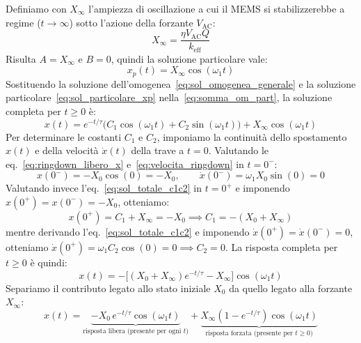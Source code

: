 \documentclass[11pt,a4paper]{article}
\begin{document}
Definiamo con $X_\infty$ l'ampiezza di oscillazione a cui il MEMS si stabilizzerebbe a regime ($t \to \infty$) sotto l'azione della forzante $V_{\text{AC}}$:
\begin{equation}
    \label{eq:def_X_inf}
    X_\infty = \frac{\eta V_{\text{AC}} Q}{k_{\text{eff}}}
\end{equation}
Risulta $A = X_\infty$ e $B = 0$, quindi la soluzione particolare vale:
\begin{equation}
    \label{eq:sol_particolare_xp}
    x_p(t) = X_\infty \cos(\omega_1 t)
\end{equation}
Sostituendo la soluzione dell'omogenea~\eqref{eq:sol_omogenea_generale} e la soluzione particolare~\eqref{eq:sol_particolare_xp} nella~\eqref{eq:somma_om_part}, la soluzione completa per $t \ge 0$ è:
\begin{equation}
    \label{eq:sol_totale_c1c2}
    x(t) = e^{-t/\tau}\Big( C_1 \cos(\omega_1 t) + C_2 \sin(\omega_1 t) \Big) + X_\infty \cos(\omega_1 t)
\end{equation}
Per determinare le costanti $C_1$ e $C_2$, imponiamo la continuità dello spostamento $x(t)$ e della velocità $\dot{x}(t)$ della trave a $t = 0$. Valutando le eq.~\eqref{eq:ringdown_libero_x} e~\eqref{eq:velocita_ringdown} in $t = 0^-$:
\begin{equation}
    x(0^-) = -X_0 \cos(0) = -X_0, \qquad \dot{x}(0^-) = \omega_1 X_0 \sin(0) = 0
\end{equation}
Valutando invece l'eq.~\eqref{eq:sol_totale_c1c2} in $t = 0^+$ e imponendo $x(0^+) = x(0^-) = -X_0$, otteniamo:
\begin{equation}
    x(0^+) = C_1 + X_\infty = -X_0 \implies C_1 = -\left(X_0 + X_\infty\right)
\end{equation}
mentre derivando l'eq.~\eqref{eq:sol_totale_c1c2} e imponendo $\dot{x}(0^+) = \dot{x}(0^-) = 0$, otteniamo $\dot{x}(0^+) = \omega_1 C_2 \cos(0) = 0 \implies C_2 = 0$. La risposta completa per $t \ge 0$ è quindi:
\begin{equation}
    \label{eq:sol_x_t_mag_0}
    x(t) = -\Big[ \left(X_0 + X_\infty\right) e^{-t/\tau} - X_\infty \Big] \cos(\omega_1 t)
\end{equation}
Separiamo il contributo legato allo stato iniziale $X_0$ da quello legato alla forzante $X_\infty$:
\begin{equation}
    x(t) = \underbrace{-X_0 \, e^{-t/\tau} \cos(\omega_1 t)}_{\text{risposta libera (presente per ogni } t\text{)}} + \underbrace{X_\infty \left(1 - e^{-t/\tau}\right) \cos(\omega_1 t)}_{\text{risposta forzata (presente per } t \ge 0\text{)}}
\end{equation}
\end{document}
